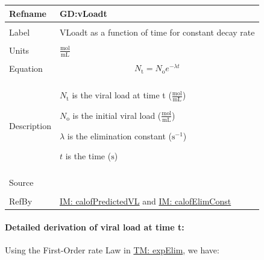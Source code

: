 \documentclass[12pt]{article}
\begin{document}
\vspace{\baselineskip}
\noindent
\begin{minipage}{\textwidth}
\begin{tabular}{>{\raggedright}p{}>{\raggedright\arraybackslash}p{}}
\toprule \textbf{Refname} & \textbf{GD:vLoadt}
\label{GD:vLoadt}
\\ \midrule \\
Label & VLoadt as a function of time for constant decay rate
        
\\ \midrule \\
Units & $\frac{\text{mol}}{\text{mL}}$
        
\\ \midrule \\
Equation & \begin{displaymath}
           {N_{\text{t}}}={N_{\text{o}}} e^{-λ t}
           \end{displaymath}
\\ \midrule \\
Description & \begin{symbDescription}
              \item{${N_{\text{t}}}$ is the viral load at time t ($\frac{\text{mol}}{\text{mL}}$)}
              \item{${N_{\text{o}}}$ is the initial viral load ($\frac{\text{mol}}{\text{mL}}$)}
              \item{$λ$ is the elimination constant ($\text{s}^{-1}$)}
              \item{$t$ is the time (${\text{s}}$)}
              \end{symbDescription}
\\ \midrule \\
Source & \cite{hobbie1970}
         
\\ \midrule \\
RefBy & \hyperref[IM:calofPredictedVL]{IM: calofPredictedVL} and \hyperref[IM:calofElimConst]{IM: calofElimConst}
        
\\ \bottomrule
\end{tabular}
\end{minipage}
\paragraph{Detailed derivation of viral load at time t:}
\label{GD:vLoadtDeriv}
Using the First-Order rate Law in \hyperref[TM:expElim]{TM: expElim}, we have:
\end{document}

